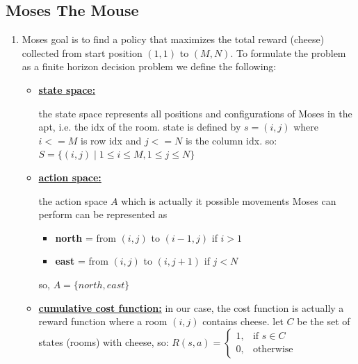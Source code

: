 \documentclass{assignmeownt}
\begin{document}
\subsection{Moses The Mouse}
\begin{enumerate}
  \item Moses goal is to find a policy that maximizes the total reward (cheese) collected from start position $(1,1)$ to $(M,N)$. 
  \newline
  To formulate the problem as a finite horizon decision problem we define the following:
    \begin{itemize} %
    \item \textbf{\underline{state space:}}
    
    the state space represents all positions and configurations of Moses in the apt, i.e. the idx of the room.
    state is defined by $s = (i,j)$ where $i<=M$ is row idx and $j<=N$ is the column idx. so:
    \newline
    \begin{math}
        S=\{(i,j) \mid 1\leq i\leq M, 1\leq j\leq N\}
    \end{math}
    \item \textbf{\underline{action space:}}
    
    
    the action space $A$  which is actually it possible movements Moses can perform can be represented as 
    \begin{itemize} 
        \item \textbf{north} = from $(i,j)$ to $(i-1, j)$ if $i>1$  
        \item \textbf{east} = from $(i,j)$ to $(i, j+1)$ if $j<N$  
    \end{itemize}    
    so, $A = \{north, east\}$

    \item \textbf{\underline{cumulative cost function:}}
    \newline
    in our case, the cost function is actually a reward function where a room $(i, j)$ contains cheese. let $C$ be the set of states (rooms) with cheese, so:
    \newline
    \begin{math}
            R(s,a)= 
            \begin{cases}
                1,& \text{if } s\in C\\
                0,              & \text{otherwise}
            \end{cases}
    \end{math}
    

\end{itemize}
\end{enumerate}
\end{document}
